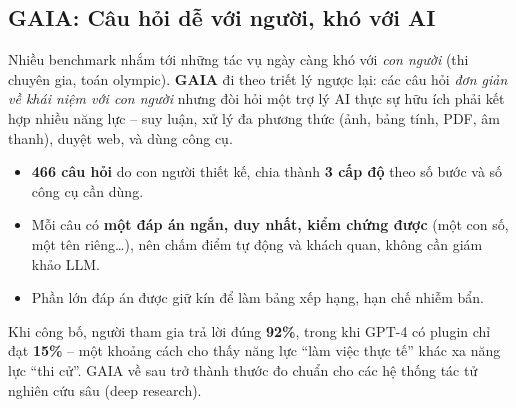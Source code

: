 \subsection{GAIA: Câu hỏi dễ với người, khó với AI}
\label{ssec:gaia}
Nhiều benchmark nhắm tới những tác vụ ngày càng khó với \emph{con người} (thi chuyên gia, toán olympic). \textbf{GAIA} \cite{mialon2024gaia} đi theo triết lý ngược lại: các câu hỏi \emph{đơn giản về khái niệm với con người} nhưng đòi hỏi một trợ lý AI thực sự hữu ích phải kết hợp nhiều năng lực -- suy luận, xử lý đa phương thức (ảnh, bảng tính, PDF, âm thanh), duyệt web, và dùng công cụ.
\begin{itemize}
	\item \textbf{466 câu hỏi} do con người thiết kế, chia thành \textbf{3 cấp độ} theo số bước và số công cụ cần dùng.
	\item Mỗi câu có \textbf{một đáp án ngắn, duy nhất, kiểm chứng được} (một con số, một tên riêng\ldots), nên chấm điểm tự động và khách quan, không cần giám khảo LLM.
	\item Phần lớn đáp án được giữ kín để làm bảng xếp hạng, hạn chế nhiễm bẩn.
\end{itemize}
Khi công bố, người tham gia trả lời đúng \textbf{92\%}, trong khi GPT-4 có plugin chỉ đạt \textbf{15\%} -- một khoảng cách cho thấy năng lực “làm việc thực tế” khác xa năng lực “thi cử”. GAIA về sau trở thành thước đo chuẩn cho các hệ thống tác tử nghiên cứu sâu (deep research).

